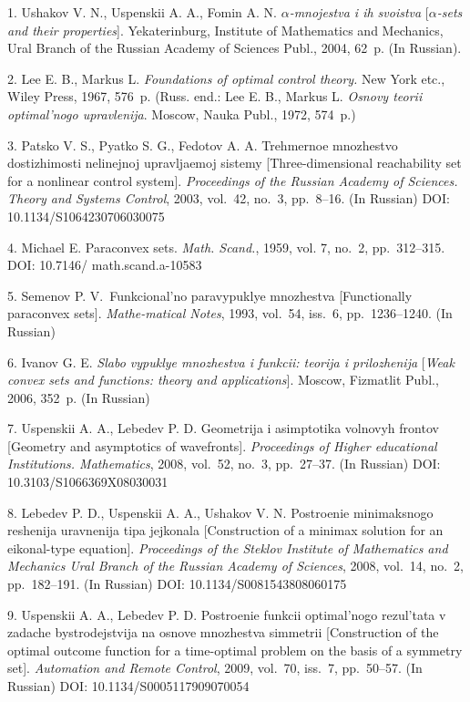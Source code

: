 {\footnotesize


1. Ushakov V. N., Uspenskii A. A., Fomin A. N.  {\it
$\alpha$-mnojestva i ih svoistva} [\textit{$\alpha$-sets and their
properties}]. Yekaterinburg,  Institute of Mathematics and
Mechanics, Ural Branch of the Russian Academy of Sciences Publ.,
2004, 62~p. (In Russian).

2. Lee E. B., Markus L. {\it Foundations of optimal control
theory.}  New York etc., Wiley Press, 1967, 576~p. (Russ. end.:
Lee E. B., Markus L. \textit{Osnovy teorii optimal'nogo
upravlenija}. Moscow, Nauka Publ., 1972, 574~p.)

3. Patsko V. S., Pyatko S. G., Fedotov A. A. Trehmernoe mnozhestvo
dostizhimosti nelinejnoj upravljaemoj sistemy [Three-dimensional
reachability set for a nonlinear control system].
\textit{Proceedings of the Russian Academy of Sciences. Theory and
Systems Control}, 2003, vol.~42, no.~3, pp.~8--16. (In Russian)
DOI: 10.1134/S1064230706030075

4. Michael E. Paraconvex sets. \textit{Math. Scand.}, 1959, vol.
7, no.~2, pp.~312--315. DOI: 10.7146/ math.scand.a-10583

5. Semenov P. V.\, Funkcional'no paravypuklye mnozhestva
[Functionally paraconvex sets]. \textit{Mathe-\linebreak matical
Notes}, 1993, vol.~54, iss.~6, pp.~1236--1240. (In Russian)

6. Ivanov G. E. {\it Slabo vypuklye mnozhestva i funkcii: teorija
i prilozhenija} [{\it Weak convex sets and functions: theory and
applications}]. Moscow, Fizmatlit Publ., 2006, 352~p. (In Russian)

7. Uspenskii A. A., Lebedev P. D. Geometrija i asimptotika
volnovyh frontov [Geometry and asymptotics of wavefronts].
\textit{Proceedings of Higher educational Institutions.
Mathematics}, 2008, vol.~52, no.~3, pp.~27--37. (In Russian) DOI:
10.3103/S1066369X08030031

8. Lebedev P. D., Uspenskii A. A., Ushakov V. N. Postroenie
minimaksnogo reshenija uravnenija tipa jejkonala [Construction of
a minimax solution for an eikonal-type equation].
\textit{Proceedings of the Steklov Institute of Mathematics and
Mechanics Ural Branch of the Russian Academy of Sciences}, 2008,
vol.~14, no.~2, pp.~182--191. (In Russian) DOI:
10.1134/S0081543808060175

9. Uspenskii A. A., Lebedev P. D. Postroenie funkcii optimal'nogo
rezul'tata v zadache bystrodejstvija na osnove mnozhestva
simmetrii [Construction of the optimal outcome func\-ti\-on for a
time-optimal problem on the basis of a symmetry set].
\textit{Automation and Remote Control}, 2009, vol.~70, iss.~7,
pp.~50--57. (In Russian) DOI: 10.1134/S0005117909070054

}
